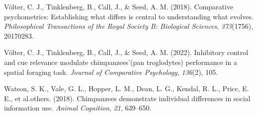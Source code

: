 \documentclass[
  man,floatsintext]{apa6}
\newlength{\cslhangindent}
\newlength{\cslentryspacingunit} %
\newenvironment{CSLReferences}[2] %
 {%
  \setlength{\parindent}{0pt}
  \ifodd #1
  \let\oldpar\par
  \def\par{\hangindent=\cslhangindent\oldpar}
  \fi
  \setlength{\parskip}{#2\cslentryspacingunit}
 }%
 {}
\begin{document}
\begin{CSLReferences}{1}{0}
\leavevmode{}%
Völter, C. J., Tinklenberg, B., Call, J., \& Seed, A. M. (2018). Comparative psychometrics: Establishing what differs is central to understanding what evolves. \emph{Philosophical Transactions of the Royal Society B: Biological Sciences}, \emph{373}(1756), 20170283.

\leavevmode{}%
Völter, C. J., Tinklenberg, B., Call, J., \& Seed, A. M. (2022). Inhibitory control and cue relevance modulate chimpanzees'(pan troglodytes) performance in a spatial foraging task. \emph{Journal of Comparative Psychology}, \emph{136}(2), 105.

\leavevmode{}%
Watson, S. K., Vale, G. L., Hopper, L. M., Dean, L. G., Kendal, R. L., Price, E. E., et al.others. (2018). Chimpanzees demonstrate individual differences in social information use. \emph{Animal Cognition}, \emph{21}, 639--650.

\end{CSLReferences}
\end{document}
